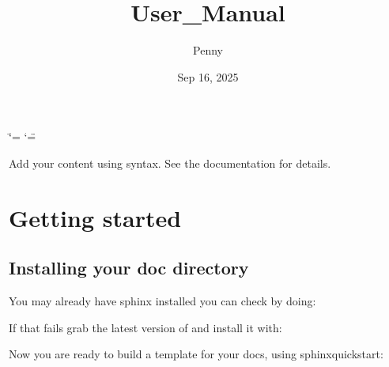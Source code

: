 \documentclass[letterpaper,10pt,english]{sphinxmanual}
\title{User\_Manual}
\date{Sep 16, 2025}
\author{Penny}
\begin{document}
\ifdefined\shorthandoff
  \ifnum\catcode`\=\string=\active\shorthandoff{=}\fi
  \ifnum\catcode`\"=\active{}\fi
\fi

\pagestyle{empty}
\sphinxmaketitle
\pagestyle{plain}
\sphinxtableofcontents
\pagestyle{normal}
\label{\detokenize{index::doc}}


\sphinxAtStartPar
Add your content using  syntax. See the
documentation for details.

\sphinxstepscope


\chapter{Getting started}
\label{\detokenize{chapter1:getting-started}}\label{\detokenize{chapter1:id1}}\label{\detokenize{chapter1::doc}}

\section{Installing your doc directory}
\label{\detokenize{chapter1:installing-your-doc-directory}}\label{\detokenize{chapter1:installing-docdir}}
\sphinxAtStartPar
You may already have sphinx 
installed \textendash{} you can check by doing:

\begin{sphinxVerbatim}[commandchars=\\\{\}]
  
\end{sphinxVerbatim}

\sphinxAtStartPar
If that fails grab the latest version of and install it with:

\begin{sphinxVerbatim}[commandchars=\\\{\}]
    
\end{sphinxVerbatim}

\sphinxAtStartPar
Now you are ready to build a template for your docs, using
sphinx\sphinxhyphen{}quickstart:

\begin{sphinxVerbatim}[commandchars=\\\{\}]
 
\end{sphinxVerbatim}
\end{document}
